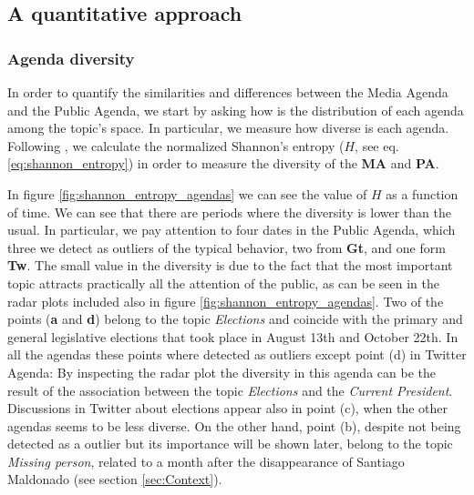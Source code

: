 \subsection{A quantitative approach}

\subsubsection{Agenda diversity}


\par In order to quantify the similarities and differences between the Media Agenda and the Public Agenda, we start by asking how is the distribution of each agenda among the topic's space. In particular, we measure how diverse is each agenda. Following \cite{boydstun2014importance}, we calculate the normalized Shannon's entropy ($H$, see eq.\ref{eq:shannon_entropy}) in order to measure the diversity of the \textbf{MA} and \textbf{PA}.
\par In figure \ref{fig:shannon_entropy_agendas} we can see the value of $H$ as a function of time. We can see that there are periods where the diversity is lower than the usual. In particular, we pay attention to four dates in the Public Agenda, which three we detect as outliers of the typical behavior, two from \textbf{Gt}, and one form \textbf{Tw}. 
The small value in the diversity is due to the fact that the most important topic attracts practically all the attention of the public, as can be seen in the radar plots included also in figure \ref{fig:shannon_entropy_agendas}. 
Two of the points (\textbf{a} and \textbf{d}) belong to the topic \emph{Elections} and coincide with the primary and general legislative elections that took place in August 13th and October 22th. 
In all the agendas these points where detected as outliers except point (d) in Twitter Agenda: By inspecting the radar plot the diversity in this agenda can be the result of the association between the topic \emph{Elections} and the \emph{Current President}.
Discussions in Twitter about elections appear also in point (c), when the other agendas seems to be less diverse. 
On the other hand, point (b), despite not being detected as a outlier but its importance will be shown later, belong to the topic \emph{Missing person}, related to a month after the disappearance of Santiago Maldonado (see section \ref{sec:Context}).

